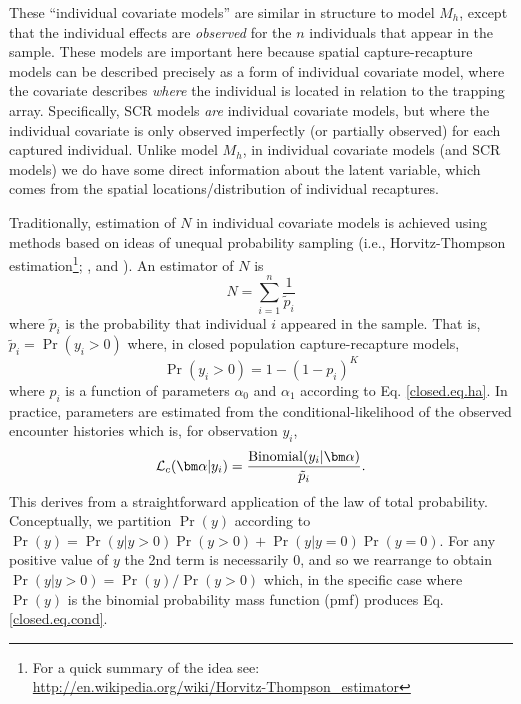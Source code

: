 These ``individual covariate models'' are similar in structure to model
$M_{h}$, except that the individual effects are {\it observed} for the
$n$ individuals that appear in the sample. These models are important
here because spatial capture-recapture models can be described
precisely as a form of individual covariate model, where the covariate
describes {\it where} the individual is located in relation to the
trapping array.  Specifically, SCR models {\it are} individual
covariate models, but where the
individual covariate is only observed imperfectly (or partially
observed) for each 
captured individual.  Unlike model $M_h$, in individual covariate
models (and SCR models) we do have some direct information about the
latent variable, which comes from the spatial locations/distribution
of individual recaptures.

Traditionally, estimation of $N$ in individual covariate models is
achieved using methods based on ideas of unequal probability sampling
(i.e., Horvitz-Thompson estimation\footnote{For a  quick summary of
  the idea see: \\
  \url{http://en.wikipedia.org/wiki/Horvitz-Thompson_estimator}};
\citet{huggins:1989},
\citet{alho:1990} and \citet{borchers_etal:2002}). An estimator of $N$ is
\[
\hat{N} = \sum_{i=1}^{n} \frac{1}{\tilde{p}_{i}}
\]
where $\tilde{p}_{i}$ is the probability that individual $i$ appeared
in the sample.  That is, $\tilde{p}_{i} = \Pr(y_{i}>0)$
where, in closed population capture-recapture models,
\[
\Pr(y_{i}>0) = 1- (1-p_{i})^K
\]
where $p_{i}$ is a function of parameters $\alpha_{0}$ and $\alpha_{1}$
according to Eq. \ref{closed.eq.ha}.  In practice, parameters are
estimated from the conditional-likelihood of the observed encounter
histories which is, for observation $y_{i}$,
\begin{equation}
{\cal L}_{c}( {\bm \alpha} | y_{i}) = \frac{ \mbox{Binomial}(y_{i}|{\bm \alpha}) } { \tilde{p}_{i}}.
\label{closed.eq.cond}
\end{equation}
This derives from a straightforward application of the law of total
probability. Conceptually, we partition $\Pr(y)$ according to
$\Pr(y) = \Pr(y|y>0)\Pr(y>0) + \Pr(y|y=0)\Pr(y=0)$. For any positive
value of $y$ the 2nd term is necessarily 0, and so we rearrange to
obtain
$\Pr(y|y>0) = \Pr(y)/\Pr(y>0)$ which, in the specific case where
$\Pr(y)$ is the
binomial probability mass function (pmf) produces Eq. \ref{closed.eq.cond}.


